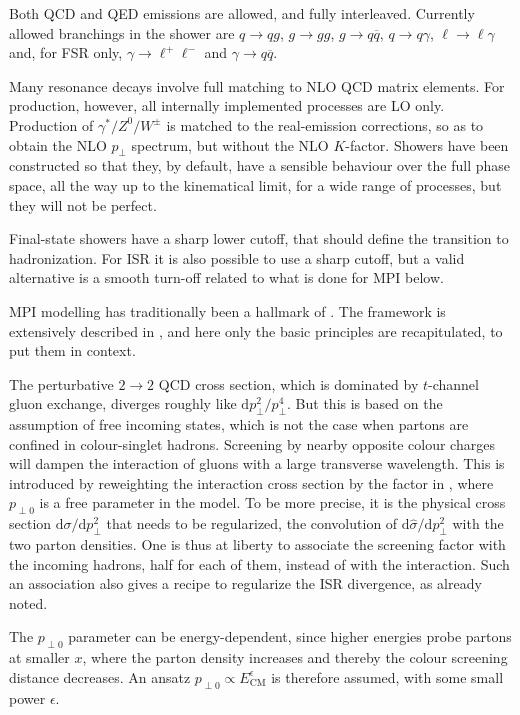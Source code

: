 Both QCD and QED emissions are allowed, and fully interleaved. 
Currently allowed branchings in the shower are $q \to qg$,
$g \to gg$, $g \to q\overline{q}$, $q \to q \gamma$,
$\ell \to \ell \gamma$ and, for FSR only, $\gamma \to \ell^+ \ell^-$
and $\gamma \to q\overline{q}$. 

Many resonance decays involve full matching to NLO QCD matrix 
elements. For production, however, all internally implemented 
processes are LO only. Production of $\gamma^*/Z^0/W^{\pm}$ is
matched to the real-emission corrections, so as to obtain the 
NLO $p_{\perp}$ spectrum, but without the NLO $K$-factor.
Showers have been constructed so that they, by default, have a 
sensible behaviour over the full phase space, all the way up to 
the kinematical limit, for a wide range of processes, but they 
will not be perfect. 

Final-state showers have a sharp lower cutoff, that should define 
the transition to hadronization. For ISR it is also possible to
use a sharp cutoff, but a valid alternative is a smooth turn-off
related to what is done for MPI below.

\mcsubsection{\gensectionMPI}

MPI modelling has traditionally been a hallmark of \pythia.
The framework is extensively described in ,
and here only the basic principles are recapitulated, to put
them in context.

The perturbative $2 \to 2$ QCD cross section, which is dominated by 
$t$-channel gluon exchange, diverges roughly like 
$\mathrm{d} p_{\perp}^2 / p_{\perp}^4$. But this is based on the 
assumption of free incoming states, which is not the case when 
partons are confined in colour-singlet hadrons. Screening by nearby 
opposite colour charges will dampen the interaction of gluons with a 
large transverse wavelength. This is introduced by reweighting the 
interaction cross section by the factor in ,
where $p_{\perp 0}$ is a free parameter in the model. To be more precise, 
it is the physical cross section $\mathrm{d} \sigma / \mathrm{d} p_{\perp}^2$ 
that needs to be regularized, \ie  the convolution of
$\mathrm{d} \hat{\sigma} / \mathrm{d} p_{\perp}^2$ with the two 
parton densities. One is thus at liberty to associate the screening 
factor with the incoming hadrons, half for each of them, instead of 
with the interaction. Such an association also gives a recipe to 
regularize the ISR divergence, as already noted.

The $p_{\perp 0}$ parameter can be energy-dependent,
since higher energies probe partons at smaller $x$, where the 
parton density increases and thereby the colour screening distance
decreases. An ansatz $p_{\perp 0} \propto E_{\mathrm{CM}}^{\epsilon}$
is therefore assumed, with some small power $\epsilon$. 

